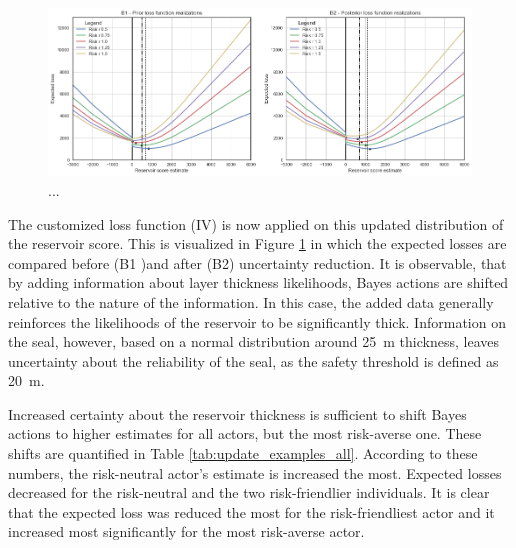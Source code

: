 	\begin{figure}[h]
		\centering
		\includegraphics[width=1\textwidth]{Figures/update_moderate3.png}
		\caption{...}\label{fig:update_moderate3} 
	\end{figure}
	
	The customized loss function (IV) is now applied on this updated distribution of the reservoir score. This is visualized in Figure \ref{fig:update_moderate3} in which the expected losses are compared before (B1 )and after (B2) uncertainty reduction. It is observable, that by adding information about layer thickness likelihoods, Bayes actions are shifted relative to the nature of the information. In this case, the added data generally reinforces the likelihoods of the reservoir to be significantly thick. Information on the seal, however, based on a normal distribution around 25~m thickness, leaves uncertainty about the reliability of the seal, as the safety threshold is defined as 20~m. 
	
	
	Increased certainty about the reservoir thickness is sufficient to shift Bayes actions to higher estimates for all actors, but the most risk-averse one. These shifts are quantified in Table \ref{tab:update_examples_all}. According to these numbers, the risk-neutral actor's estimate is increased the most. Expected losses decreased for the risk-neutral and the two risk-friendlier individuals. It is clear that the expected loss was reduced the most for the risk-friendliest actor and it increased most significantly for the most risk-averse actor.
	
